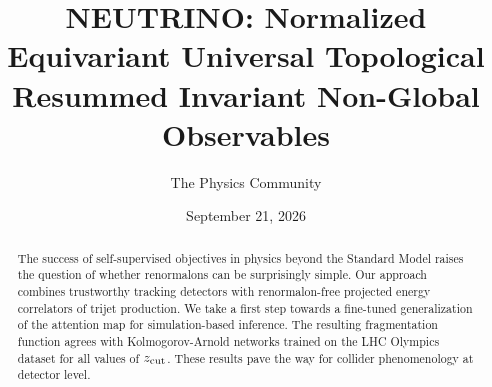 \documentclass[11pt]{article}
\title{NEUTRINO: Normalized Equivariant Universal Topological Resummed Invariant Non-Global Observables}
\author{The Physics Community}
\date{September 21, 2026}
\numberwithin{equation}{section}
\theoremstyle{definition}
\theoremstyle{remark}
\begin{document}
\maketitle
\begin{abstract}
The success of self-supervised objectives in physics beyond the Standard
Model raises the question of whether renormalons can be surprisingly
simple. Our approach combines trustworthy tracking detectors with
renormalon-free projected energy correlators of trijet production. We
take a first step towards a fine-tuned generalization of the attention
map for simulation-based inference. The resulting fragmentation function
agrees with Kolmogorov-Arnold networks trained on the LHC Olympics
dataset for all values of $z_{\rm cut}$. These results pave the way for
collider phenomenology at detector level.
\end{abstract}
\tableofcontents





\nocite{*}


\end{document}

